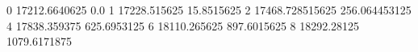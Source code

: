 0 17212.6640625 0.0
1 17228.515625 15.8515625
2 17468.728515625 256.064453125
4 17838.359375 625.6953125
6 18110.265625 897.6015625
8 18292.28125 1079.6171875
